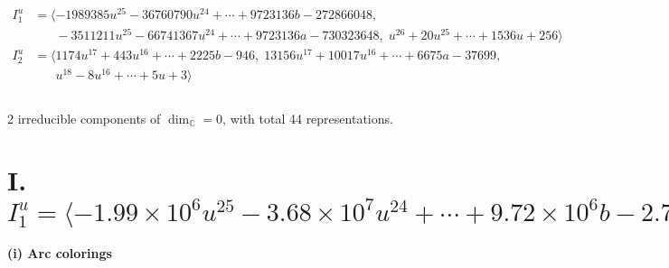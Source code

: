 \documentclass[1p]{elsarticle_modified}
\theoremstyle{definition}
\begin{document}
\begin{align*}
I^u_{1}&=\langle 
-1989385 u^{25}-36760790 u^{24}+\cdots+9723136 b-272866048,\\
\phantom{I^u_{1}}&\phantom{= \langle  }-3511211 u^{25}-66741367 u^{24}+\cdots+9723136 a-730323648,\;u^{26}+20 u^{25}+\cdots+1536 u+256\rangle \\
I^u_{2}&=\langle 
1174 u^{17}+443 u^{16}+\cdots+2225 b-946,\;13156 u^{17}+10017 u^{16}+\cdots+6675 a-37699,\\
\phantom{I^u_{2}}&\phantom{= \langle  }u^{18}-8 u^{16}+\cdots+5 u+3\rangle \\
\\
\end{align*}
\raggedright * 2 irreducible components of $\dim_{\mathbb{C}}=0$, with total 44 representations.\\
\newpage
\renewcommand{\arraystretch}{1}
\centering \section*{I. $I^u_{1}= \langle -1.99\times10^{6} u^{25}-3.68\times10^{7} u^{24}+\cdots+9.72\times10^{6} b-2.73\times10^{8},\;-3.51\times10^{6} u^{25}-6.67\times10^{7} u^{24}+\cdots+9.72\times10^{6} a-7.30\times10^{8},\;u^{26}+20 u^{25}+\cdots+1536 u+256 \rangle$}
\flushleft \textbf{(i) Arc colorings}\\
\end{document}
